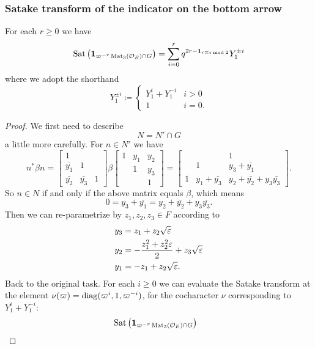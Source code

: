 \subsubsection{Satake transform of the indicator on the bottom arrow}
\begin{proposition}
  For each $r \ge 0$ we have
  \[ \operatorname{Sat}\left(\mathbf{1}_{\varpi^{-r} \operatorname{Mat}_3(\mathcal O_E) \cap G}\right)
    = \sum_{i=0}^r q^{2r - \mathbf{1}_{r \equiv i \bmod 2}} Y_1^{\pm i} \]
  where we adopt the shorthand
  \[
    Y_1^{\pm i} \coloneqq
    \begin{cases}
      Y_1^i + Y_1^{-i} & i > 0 \\
      1 & i = 0 .
    \end{cases}
  \]
\end{proposition}
\begin{proof}
  We first need to describe \[ N = N' \cap G \] a little more carefully.
  For $n \in N'$ we have
  \[
    n^\ast \beta n
    =
    \begin{bmatrix} 1 \\ \bar{y_1} & 1 \\ \bar{y_2} & \bar{y_3} & 1 \end{bmatrix}
    \beta
    \begin{bmatrix}
      1 & y_1 & y_2 \\
        & 1 & y_3 \\
        & & 1
    \end{bmatrix}
    = \begin{bmatrix}
      & & 1 \\
      & 1 & y_3 + \bar{y_1} \\
      1 & y_1 + \bar{y_3} & y_2 + \bar{y_2} + y_3 \bar{y_3}
    \end{bmatrix}.
  \]
  So $n \in N$ if and only if the above matrix equals $\beta$, which means
  \[ 0 = y_3 + \bar{y_1} = y_2 + \bar{y_2} + y_3 \bar{y_3}. \]
  Then we can re-parametrize by $z_1, z_2, z_3 \in F$ according to
  \begin{align*}
    y_3 &= z_1 + z_2 \sqrt{\varepsilon} \\
    y_2 &= -\frac{z_1^2 + z_2^2 \varepsilon}{2} + z_3\sqrt{\varepsilon} \\
    y_1 &= -z_1 + z_2\sqrt{\varepsilon}.
  \end{align*}
  Back to the original task.
  For each $i \ge 0$ we can evaluate the Satake transform at the element
  $\nu(\varpi) = \operatorname{diag}(\varpi^i, 1, \varpi^{-i})$, for the cocharacter $\nu$
  corresponding to $Y_1^i + Y_1^{-i}$:
  \begin{align*}
    &\Sat\left( \mathbf{1}_{\varpi^{-r} \Mat_3(\OO_E) \cap G}\right)

\end{align*}
\end{proof}
